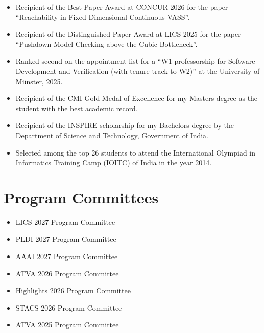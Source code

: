 \documentclass[11pt,a4paper,sans]{moderncv}        %
\begin{document}
\begin{itemize}

	\item{Recipient of the Best Paper Award at CONCUR 2026 for the paper ``Reachability in Fixed-Dimensional Continuous VASS''.}
	
	\item{Recipient of the Distinguished Paper Award at LICS 2025 for the paper ``Pushdown Model Checking above the Cubic Bottleneck''.}

	\item{Ranked second on the appointment list for a ``W1 professorship for Software Development and Verification (with tenure track to W2)'' at the University of Münster, 2025.}
	
	\item{Recipient of the CMI Gold Medal of Excellence for my Masters degree as the student with the best academic record.}
	
	\vspace{2pt}
	
	\item{Recipient of the INSPIRE scholarship for my Bachelors degree by the Department of Science and Technology, Government of India.}
	
	\vspace{2pt}
	
	\item{Selected among the top 26 students to attend the International Olympiad in Informatics Training Camp (IOITC) of India in the year 2014.}
	
	
	
	
\end{itemize}





\section{Program Committees}

\begin{itemize}
	\setlength\itemsep{2pt}
	\item LICS 2027 Program Committee
	\item PLDI 2027 Program Committee
	\item AAAI 2027 Program Committee
	\item ATVA 2026 Program Committee
	\item Highlights 2026 Program Committee
	\item STACS 2026 Program Committee
	\item ATVA 2025 Program Committee
\end{itemize}
\end{document}
